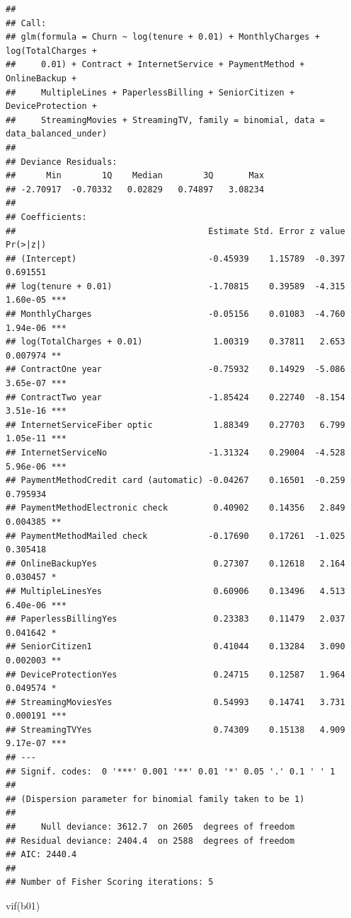 \documentclass[
  twoside]{article}
\newenvironment{Shaded}{\begin{snugshade}}{\end{snugshade}}
\newcommand{\FunctionTok}[1]{\textcolor[rgb]{0.00,0.00,0.00}{#1}}
\newcommand{\NormalTok}[1]{#1}
\begin{document}
\begin{verbatim}
## 
## Call:
## glm(formula = Churn ~ log(tenure + 0.01) + MonthlyCharges + log(TotalCharges + 
##     0.01) + Contract + InternetService + PaymentMethod + OnlineBackup + 
##     MultipleLines + PaperlessBilling + SeniorCitizen + DeviceProtection + 
##     StreamingMovies + StreamingTV, family = binomial, data = data_balanced_under)
## 
## Deviance Residuals: 
##      Min        1Q    Median        3Q       Max  
## -2.70917  -0.70332   0.02829   0.74897   3.08234  
## 
## Coefficients:
##                                      Estimate Std. Error z value Pr(>|z|)    
## (Intercept)                          -0.45939    1.15789  -0.397 0.691551    
## log(tenure + 0.01)                   -1.70815    0.39589  -4.315 1.60e-05 ***
## MonthlyCharges                       -0.05156    0.01083  -4.760 1.94e-06 ***
## log(TotalCharges + 0.01)              1.00319    0.37811   2.653 0.007974 ** 
## ContractOne year                     -0.75932    0.14929  -5.086 3.65e-07 ***
## ContractTwo year                     -1.85424    0.22740  -8.154 3.51e-16 ***
## InternetServiceFiber optic            1.88349    0.27703   6.799 1.05e-11 ***
## InternetServiceNo                    -1.31324    0.29004  -4.528 5.96e-06 ***
## PaymentMethodCredit card (automatic) -0.04267    0.16501  -0.259 0.795934    
## PaymentMethodElectronic check         0.40902    0.14356   2.849 0.004385 ** 
## PaymentMethodMailed check            -0.17690    0.17261  -1.025 0.305418    
## OnlineBackupYes                       0.27307    0.12618   2.164 0.030457 *  
## MultipleLinesYes                      0.60906    0.13496   4.513 6.40e-06 ***
## PaperlessBillingYes                   0.23383    0.11479   2.037 0.041642 *  
## SeniorCitizen1                        0.41044    0.13284   3.090 0.002003 ** 
## DeviceProtectionYes                   0.24715    0.12587   1.964 0.049574 *  
## StreamingMoviesYes                    0.54993    0.14741   3.731 0.000191 ***
## StreamingTVYes                        0.74309    0.15138   4.909 9.17e-07 ***
## ---
## Signif. codes:  0 '***' 0.001 '**' 0.01 '*' 0.05 '.' 0.1 ' ' 1
## 
## (Dispersion parameter for binomial family taken to be 1)
## 
##     Null deviance: 3612.7  on 2605  degrees of freedom
## Residual deviance: 2404.4  on 2588  degrees of freedom
## AIC: 2440.4
## 
## Number of Fisher Scoring iterations: 5
\end{verbatim}

\begin{Shaded}
\begin{Highlighting}[]
\FunctionTok{vif}\NormalTok{(b01)}
\end{Highlighting}
\end{Shaded}
\end{document}
